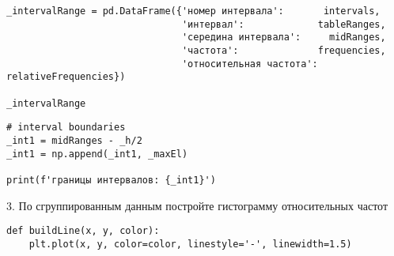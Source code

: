\documentclass[a4paper, 14pt]{extarticle}
\begin{document}
\begin{lstlisting}
_intervalRange = pd.DataFrame({'номер интервала':       intervals, 
                               'интервал':             tableRanges, 
                               'середина интервала':     midRanges,
                               'частота':              frequencies,
                               'относительная частота': relativeFrequencies})

_intervalRange
\end{lstlisting}

\begin{lstlisting}
# interval boundaries
_int1 = midRanges - _h/2
_int1 = np.append(_int1, _maxEl)

print(f'границы интервалов: {_int1}')
\end{lstlisting}

\begin{center}
    3. По сгруппированным данным постройте гистограмму относительных частот
\end{center}

\begin{lstlisting}
def buildLine(x, y, color):
    plt.plot(x, y, color=color, linestyle='-', linewidth=1.5)
\end{lstlisting}
\end{document}
